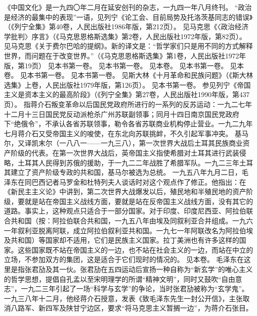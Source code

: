 \begin{maonote}
《中国文化》是一九四〇年二月在延安创刊的杂志，一九四一年八月终刊。
“政治是经济的最集中的表现”一语，见列宁《论工会、目前局势及托洛茨基同志的错误》（《列宁全集》第40卷，人民出版社1986年版，第212页）。
见马克思《〈政治经济学批判〉序言》（《马克思恩格斯选集》第2卷，人民出版社1972年版，第82页）。
见马克思《关于费尔巴哈的提纲》。新的译文是：“哲学家们只是用不同的方式解释世界，而问题在于改变世界。”（《马克思恩格斯选集》第1卷，人民出版社1972年版，第19页）
见本书第一卷。
见本书第一卷。
见本卷。
见本书第一卷。
见本卷。
见本书第一卷。
见本书第一卷。
见斯大林《十月革命和民族问题》（《斯大林选集》上卷，人民出版社1979年版，第126页）。
见本书第一卷。
参见列宁《帝国主义是资本主义的最高阶段》（《列宁全集》第27卷，人民出版社1990年版，第437页）。
指蒋介石叛变革命以后国民党政府所进行的一系列的反苏运动：一九二七年十二月十三日国民党反动派枪杀广州苏联副领事；同月十四日南京国民党政府下“绝俄令”，不承认各省苏联领事，勒令各省苏联商业机构停止营业。一九二九年七月蒋介石又受帝国主义的唆使，在东北向苏联挑衅，不久引起军事冲突。
基马尔，又译凯末尔（一八八一——一九三八），第一次世界大战后土耳其民族商业资产阶级的代表。在第一次世界大战后，英帝国主义指使希腊对土耳其进行武装侵略，土耳其人民得到苏俄的援助，于一九二二年战胜了希腊军队。一九二三年土耳其建立了资产阶级专政的共和国，基马尔被选为总统。
一九五八年九月二日，毛泽东在同巴西记者马罗金和杜特列夫人谈话时对这个观点作了修正。他指出：在《新民主主义论》中讲到，第二次世界大战爆发以后，殖民地和半殖民地的资产阶级，要就是站在帝国主义战线方面，要就是站在反帝国主义战线方面，没有其它的道路。事实上，这种观点只适合于一部分国家。对于印度、印度尼西亚、阿拉伯联合共和国（按：阿拉伯联合共和国，一九五八年由埃及同叙利亚合并组成。一九六一年叙利亚脱离阿联，成立阿拉伯叙利亚共和国。一九七一年阿联改名为阿拉伯埃及共和国）等国家却不适用，它们是民族主义国家。拉丁美洲也有许多这样的国家。这些国家既不站在帝国主义的一边，也不站在社会主义的一边，而站在中立的立场，不参加双方的集团，这是适合于它们现时的情况的。
见本卷。
毛泽东在这里是指张君劢及其一伙。张君劢在五四运动后宣扬一种自称为“新玄学”的唯心主义的哲学思想，提倡自孔孟以至宋明理学的所谓“精神文明”，同时又鼓吹“自由意志”，一九二三年引起了一场“科学与玄学”的争论，当时张君劢被称为“玄学鬼”。一九三八年十二月，他经蒋介石授意，发表《致毛泽东先生一封公开信》，主张取消八路军、新四军及陕甘宁边区，要求“将马克思主义暂搁一边”，为蒋介石张目。

\end{maonote}
